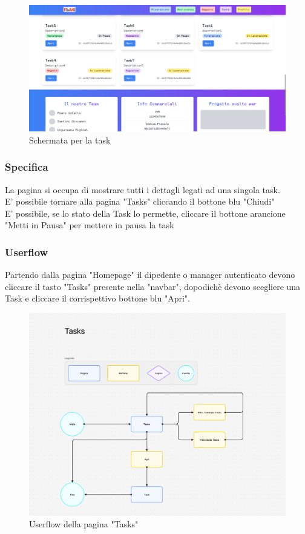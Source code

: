 \documentclass{report}
\begin{document}
\begin{figure}[H]
	\centering\includegraphics[width=1\textwidth]{images/microservizio-task/frontend/tasks.jpg}
	\caption{Schermata per la task}
\end{figure}
\subsubsection*{Specifica}
La pagina si occupa di mostrare tutti i dettagli legati ad una singola task.\\ E' possibile tornare alla pagina "Tasks" cliccando il bottone blu "Chiudi"\\
E' possibile, se lo stato della Task lo permette, cliccare il bottone arancione "Metti in Pausa" per mettere in pausa la task\\

\subsubsection*{Userflow}
Partendo dalla pagina "Homepage" il dipedente o manager autenticato devono cliccare il tasto "Tasks" presente nella "navbar", dopodichè devono scegliere una Task e cliccare il corrispettivo bottone blu "Apri".
\begin{figure}[H]
	\centering\includegraphics[width=1\textwidth]{images/microservizio-task/frontend/tasks-userflow.png}
	Userflow della pagina "Tasks"
\end{figure}
\end{document}
